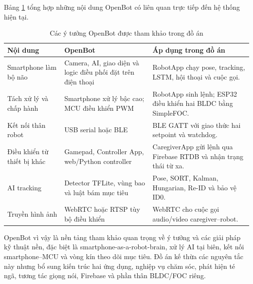 Bảng \ref{tab:openbot_inheritance} tổng hợp những nội dung OpenBot có liên quan trực tiếp đến hệ thống hiện tại.

\begin{table}[htbp]
\centering
\caption{Các ý tưởng OpenBot được tham khảo trong đồ án}
\label{tab:openbot_inheritance}
\small
\begin{tabularx}{\textwidth}{|p{3.2cm}|X|X|}
\hline
\textbf{Nội dung} & \textbf{OpenBot} & \textbf{Áp dụng trong đồ án} \\
\hline
Smartphone làm bộ não & Camera, AI, giao diện và logic điều phối đặt trên điện thoại & RobotApp chạy pose, tracking, LSTM, hội thoại và cuộc gọi. \\
\hline
Tách xử lý và chấp hành & Smartphone xử lý bậc cao; MCU điều khiển PWM & RobotApp sinh lệnh; ESP32 điều khiển hai BLDC bằng SimpleFOC. \\
\hline
Kết nối thân robot & USB serial hoặc BLE & BLE GATT với giao thức hai setpoint và watchdog. \\
\hline
Điều khiển từ thiết bị khác & Gamepad, Controller App, web/Python controller & CaregiverApp gửi lệnh qua Firebase RTDB và nhận trạng thái từ xa. \\
\hline
AI tracking & Detector TFLite, vùng bao và luật bám mục tiêu & Pose, SORT, Kalman, Hungarian, Re-ID và bảo vệ ID0. \\
\hline
Truyền hình ảnh & WebRTC hoặc RTSP tùy bộ điều khiển & WebRTC cho cuộc gọi audio/video caregiver--robot. \\
\hline
\end{tabularx}
\end{table}

OpenBot vì vậy là nền tảng tham khảo quan trọng về ý tưởng và các giải pháp kỹ thuật nền, đặc biệt là smartphone-as-a-robot-brain, xử lý AI tại biên, kết nối smartphone--MCU và vòng kín theo dõi mục tiêu. Đồ án kế thừa các nguyên tắc này nhưng bổ sung kiến trúc hai ứng dụng, nghiệp vụ chăm sóc, phát hiện té ngã, tương tác giọng nói, Firebase và phần thân BLDC/FOC riêng.
